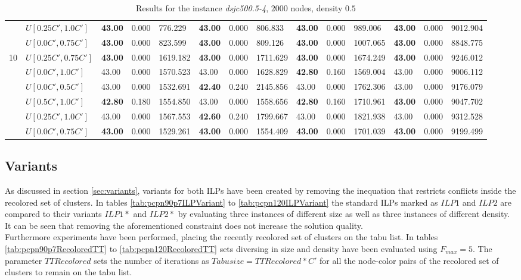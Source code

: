 \begin{table}[h]
{\begin{tabular}{|l|l||l|l|l||l|l|l||l|l|l||l|l|l|}
       & $U[0.25C',1.0C']$ & \textbf{43.00} & 0.000 & 776.229 & \textbf{43.00} & 0.000 & 806.833  & \textbf{43.00} & 0.000 & 989.006 & \textbf{43.00} & 0.000 & 9012.904\\
       & $U[0.0C',0.75C']$ & \textbf{43.00} & 0.000 & 823.599 & \textbf{43.00} & 0.000 & 809.126  & \textbf{43.00} & 0.000 & 1007.065 & \textbf{43.00} & 0.000 & 8848.775\\
      \hline\hline
      \multirow{6}{*}{10}
      & $U[0.25C',0.75C']$ & \textbf{43.00} & 0.000 & 1619.182 & \textbf{43.00} & 0.000 & 1711.629 	& \textbf{43.00} & 0.000 & 1674.249 & \textbf{43.00} & 0.000 & 9246.012\\
       & $U[0.0C',1.0C']$ & 43.00 & 0.000 & 1570.523 & 43.00 & 0.000 & 1628.829 	& \textbf{42.80} & 0.160 & 1569.004 & 43.00 & 0.000 & 9006.112\\
       & $U[0.0C',0.5C']$ & 43.00 & 0.000 & 1532.691 & \textbf{42.40} & 0.240 & 2145.856 		& 43.00 & 0.000 & 1762.306 & 43.00 & 0.000 & 9176.079\\
       & $U[0.5C',1.0C']$ & \textbf{42.80} & 0.180 & 1554.850 & 43.00 & 0.000 & 1558.656 	& \textbf{42.80} & 0.160 & 1710.961 & \textbf{43.00} & 0.000 & 9047.702\\
       & $U[0.25C',1.0C']$ & 43.00 & 0.000 & 1567.553 & \textbf{42.60} & 0.240 & 1799.667 	& 43.00 & 0.000 & 1821.938 & 43.00 & 0.000 & 9312.528\\
       & $U[0.0C',0.75C']$ & \textbf{43.00} & 0.000 & 1529.261 & \textbf{43.00} & 0.000 & 1554.409 	& \textbf{43.00} & 0.000 & 1701.039 & \textbf{43.00} & 0.000 & 9199.499\\
      \hline
      \end{tabular}
      }
      \caption{Results for the instance \textit{dsjc500.5-4}, $2000$ nodes, density $0.5$}
      \label{tab:in4}\end{table}


\clearpage

\subsection{Variants}
As discussed in section \ref{sec:variants}, variants for both ILPs have been created by removing the inequation that restricts conflicts inside the recolored set of clusters. In tables \ref{tab:pcpn90p7ILPVariant} to \ref{tab:pcpn120ILPVariant} the standard ILPs marked as $ILP1$ and $ILP2$ are compared to their variants $ILP1*$ and $ILP2*$ by evaluating three instances of different size as well as three instances of different density. It can be seen that removing the aforementioned constraint does not increase the solution quality.\\
Furthermore experiments have been performed, placing the recently recolored set of clusters on the tabu list. In tables \ref{tab:pcpn90p7RecoloredTT} to \ref{tab:pcpn120RecoloredTT} sets diversing in size and density have been evaluated using $F_{max}=5$. The parameter $TTRecolored$ sets the number of iterations as $Tabusize=TTRecolored*C'$ for all the node-color pairs of the recolored set of clusters to remain on the tabu list.

